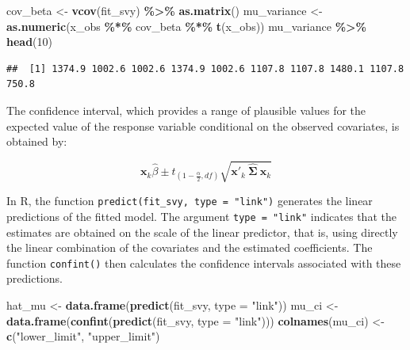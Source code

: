 \documentclass[
  english,
  12pt,
]{book}
\newenvironment{Shaded}{\begin{snugshade}}{\end{snugshade}}
\newcommand{\AttributeTok}[1]{\textcolor[rgb]{0.13,0.29,0.53}{#1}}
\newcommand{\DecValTok}[1]{\textcolor[rgb]{0.00,0.00,0.81}{#1}}
\newcommand{\FunctionTok}[1]{\textcolor[rgb]{0.13,0.29,0.53}{\textbf{#1}}}
\newcommand{\NormalTok}[1]{#1}
\newcommand{\OtherTok}[1]{\textcolor[rgb]{0.56,0.35,0.01}{#1}}
\newcommand{\SpecialCharTok}[1]{\textcolor[rgb]{0.81,0.36,0.00}{\textbf{#1}}}
\newcommand{\StringTok}[1]{\textcolor[rgb]{0.31,0.60,0.02}{#1}}
\begin{document}
\begin{Shaded}
\begin{Highlighting}[]
\NormalTok{cov\_beta }\OtherTok{\textless{}{-}} \FunctionTok{vcov}\NormalTok{(fit\_svy) }\SpecialCharTok{\%\textgreater{}\%}
  \FunctionTok{as.matrix}\NormalTok{()}
\NormalTok{mu\_variance }\OtherTok{\textless{}{-}} \FunctionTok{as.numeric}\NormalTok{(x\_obs }\SpecialCharTok{\%*\%}\NormalTok{ cov\_beta }\SpecialCharTok{\%*\%} \FunctionTok{t}\NormalTok{(x\_obs))}
\NormalTok{mu\_variance }\SpecialCharTok{\%\textgreater{}\%}
  \FunctionTok{head}\NormalTok{(}\DecValTok{10}\NormalTok{)}
\end{Highlighting}
\end{Shaded}

\begin{verbatim}
##  [1] 1374.9 1002.6 1002.6 1374.9 1002.6 1107.8 1107.8 1480.1 1107.8  750.8
\end{verbatim}

The confidence interval, which provides a range of plausible values for the expected value of the response variable conditional on the observed covariates, is obtained by:

\[
\mathbf{x}_{k}\hat{\beta}\pm t_{\left(1-\frac{\alpha}{2},df\right)}\sqrt{\mathbf{x}'_{k} \
\hat{\boldsymbol{\Sigma}} \
\mathbf{x}_{k}}
\]

In R, the function \texttt{predict(fit\_svy,\ type\ =\ "link")} generates the linear predictions of the fitted model. The argument \texttt{type\ =\ "link"} indicates that the estimates are obtained on the scale of the linear predictor, that is, using directly the linear combination of the covariates and the estimated coefficients. The function \texttt{confint()} then calculates the confidence intervals associated with these predictions.

\begin{Shaded}
\begin{Highlighting}[]
\NormalTok{hat\_mu }\OtherTok{\textless{}{-}} \FunctionTok{data.frame}\NormalTok{(}\FunctionTok{predict}\NormalTok{(fit\_svy, }\AttributeTok{type =} \StringTok{"link"}\NormalTok{))}
\NormalTok{mu\_ci }\OtherTok{\textless{}{-}} \FunctionTok{data.frame}\NormalTok{(}\FunctionTok{confint}\NormalTok{(}\FunctionTok{predict}\NormalTok{(fit\_svy, }\AttributeTok{type =} \StringTok{"link"}\NormalTok{)))}
\FunctionTok{colnames}\NormalTok{(mu\_ci) }\OtherTok{\textless{}{-}} \FunctionTok{c}\NormalTok{(}\StringTok{"lower\_limit"}\NormalTok{, }\StringTok{"upper\_limit"}\NormalTok{)}
\end{Highlighting}
\end{Shaded}
\end{document}
